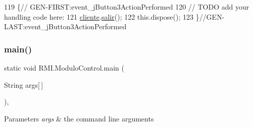 \begin{DoxyCode}
119                                                                          \{\textcolor{comment}{//
      GEN-FIRST:event\_jButton3ActionPerformed}
120         \textcolor{comment}{// TODO add your handling code here:}
121         \mbox{\hyperlink{class_r_m_i_1_1_modulo_control_affa108de8511c1fdd849d2d6a6304d4e}{cliente}}.\mbox{\hyperlink{class_r_m_i_1_1_cliente_ae6ed71195a80194555ce07416ca64406}{salir}}();
122         this.dispose();
123     \}\textcolor{comment}{//GEN-LAST:event\_jButton3ActionPerformed}
\end{DoxyCode}
\mbox{\label{class_r_m_i_1_1_modulo_control_ab0eae3369259c22e604c80246bae02c1}} 
\subsubsection{\texorpdfstring{main()}{main()}}
{\footnotesize\ttfamily static void R\+M\+I.\+Modulo\+Control.\+main (\begin{DoxyParamCaption}\item[{String}]{args\mbox{[}$\,$\mbox{]} }\end{DoxyParamCaption})\hspace{0.3cm}{\ttfamily [inline]}, {\ttfamily [static]}}


\begin{DoxyParams}{Parameters}
{\em args} & the command line arguments \\
\hline
\end{DoxyParams}

